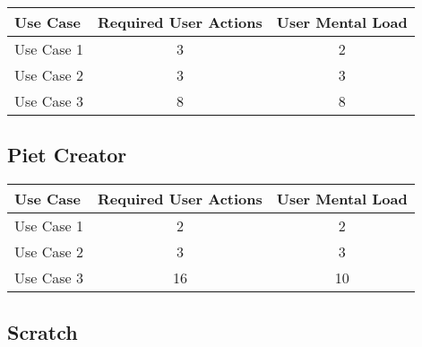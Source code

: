 \begin{tabularx}{\textwidth}{Xcc}
\textbf{Use Case} & \textbf{Required User Actions} & \textbf{User Mental Load}\\
\hline
Use Case 1                          & 3 & 2 \\
Use Case 2                          & 3 & 3 \\
Use Case 3                          & 8 & 8
\end{tabularx}

\subsection*{Piet Creator}




\begin{tabularx}{\textwidth}{Xcc}
\textbf{Use Case} & \textbf{Required User Actions} & \textbf{User Mental Load}\\
\hline
Use Case 1                          & 2 & 2 \\
Use Case 2                          & 3 & 3 \\
Use Case 3                          & 16 & 10
\end{tabularx}

\subsection*{Scratch}

